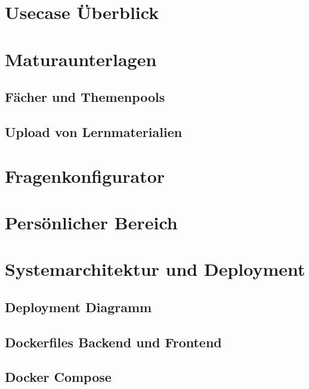 \section{Usecase Überblick}


\section{Maturaunterlagen}

    \subsection{Fächer und Themenpools}
    

    \subsection{Upload von Lernmaterialien}
    

\section{Fragenkonfigurator}


\section{Persönlicher Bereich}


\section{Systemarchitektur und Deployment}


    \subsection{Deployment Diagramm}
    

    \subsection{Dockerfiles Backend und Frontend}
    

    \subsection{Docker Compose}
    

